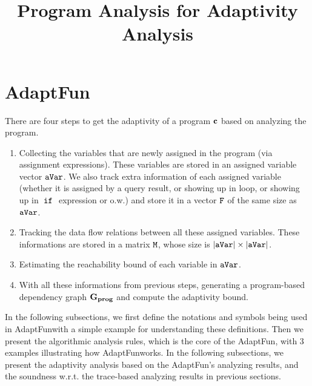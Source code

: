 \documentclass[a4paper,11pt]{article}
\newcommand{\THESYSTEM}{\textsf{AdaptFun}}
\begin{document}
\title{Program Analysis for Adaptivity Analysis}

\author{}

\date{}

\maketitle


%

%
%
\section{\THESYSTEM}
There are four steps to get the adaptivity of a program ${\boldsymbol{\mathbf{c}}}$ based on analyzing the program. 
\begin{enumerate}
    \item Collecting the variables that are newly assigned in the program (via assignment expressions). These variables are stored in an assigned variable vector $\mathtt{aVar}$. 
    We also track extra information of each assigned variable (whether it is assigned by a query result, or showing up in loop, or showing up in $\;\mathtt{if}\;$ expression or o.w.) and store it in a vector $\mathtt{F}$ of the same size as $\mathtt{aVar}$.
    \item Tracking the data flow relations between all these assigned variables. These informations are stored in a matrix $\mathtt{M}$, whose size is $|\mathtt{aVar}| \times |\mathtt{aVar}|$. 
    \item Estimating the reachability bound of each variable in $\mathtt{aVar}$.
    \item With all these informations from previous steps, generating a program-based dependency graph $\mathtt{\bf{G_{prog}}}$ and compute the adaptivity bound.
\end{enumerate}

In the following subsections, 
we first define the notations and symbols being used in \THESYSTEM  with a simple example for understanding these definitions. 
Then we present the algorithmic analysis rules, which is the core of the \THESYSTEM, with
3 examples illustrating how \THESYSTEM  works.
In the following subsections, we present the adaptivity analysis based on the \THESYSTEM's analyzing results, and the soundness w.r.t. the trace-based analyzing results in previous sections.
\end{document}
